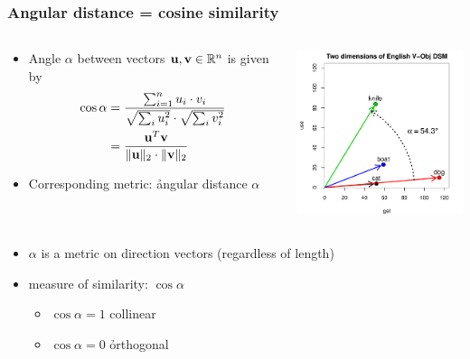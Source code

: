 \documentclass[t]{beamer} %
\begin{document}
\begin{frame}
  \frametitle{Angular distance = cosine similarity}

  \ungap[1]
  \begin{columns}[c]
    \begin{column}{5cm}
      \begin{itemize}
        \item Angle $\alpha$ between vectors $\vu,\vv\in \setR^n$ is given by
          \begin{align*}
            \cos \alpha &= 
            \frac{\sum_{i=1}^n u_i\cdot v_i}{
              \sqrt{\sum_i u_i^2}\cdot \sqrt{\sum_i v_i^2}}
            \\
            &= \frac{\vu^T \vv}{\norm[2]{\vu}\cdot \norm[2]{\vv}}
        \end{align*}
      \item<2-> Corresponding metric: \h{angular distance} $\alpha$
      \end{itemize}
    \end{column}
    \begin{column}{5cm}
      \includegraphics[width=5cm]{img/angular_distance_hieroglyph}
    \end{column}
  \end{columns}

  \gap
  \begin{itemize}
  \item<2-> $\alpha$ is a metric on direction vectors (regardless of length)
  \item<3->  measure of similarity: $\cos \alpha$
    \begin{itemize}
    \item $\cos \alpha = 1$ \so collinear
    \item $\cos \alpha = 0$ \so \h{orthogonal}
    \end{itemize}
  \end{itemize}
\end{frame}
\end{document}
